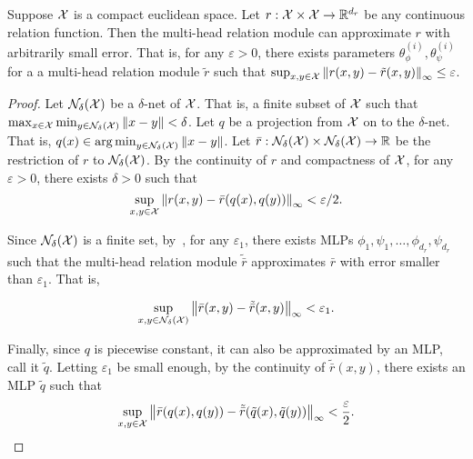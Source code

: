 \begin{theorem}\label{thm:mhr_approximates_cts_rels}
    Suppose ${\mathcal{X}}$ is a compact euclidean space. Let $r: {\mathcal{X}} \times {\mathcal{X}} \to \mathbb{R}^{d_r}$ be any continuous relation function. Then the multi-head relation module can approximate $r$ with arbitrarily small error. That is, for any $\varepsilon > 0$, there exists parameters $\theta_{\phi}^{(i)}, \theta_{\psi}^{(i)}$ for a a multi-head relation module $\tilde{r}$ such that $\sup_{x,y \in {\mathcal{X}}} \left\lVert r(x,y) - \tilde{r}(x,y)\right\rVert_{\infty} \leq \varepsilon$.
\end{theorem}

\begin{proof}
    \hphantom{~}

    Let ${\mathcal{N}}_\delta({\mathcal{X}})$ be a $\delta$-net of ${\mathcal{X}}$. That is, a finite subset of ${\mathcal{X}}$ such that $\max_{x \in {\mathcal{X}}} \min_{y \in {\mathcal{N}}_\delta({\mathcal{X}})} \left\lVert x - y\right\rVert < \delta$. Let $q$ be a projection from ${\mathcal{X}}$ on to the $\delta$-net. That is, $q(x) \in \operatorname*{arg\,min}_{y \in {\mathcal{N}}_\delta({\mathcal{X}})} \left\lVert x - y\right\rVert$. Let $\bar{r}: {\mathcal{N}}_\delta({\mathcal{X}}) \times {\mathcal{N}}_{\delta}({\mathcal{X}}) \to \mathbb{R}$ be the restriction of $r$ to ${\mathcal{N}}_{\delta}({\mathcal{X}})$. By the continuity of $r$ and compactness of ${\mathcal{X}}$, for any $\varepsilon > 0$, there exists $\delta > 0$ such that
    \begin{equation*}
        \sup_{x, y \in {\mathcal{X}}} \left\lVert r(x,y) - \bar{r}(q(x), q(y))\right\rVert_{\infty} < \varepsilon / 2.
    \end{equation*}

    Since ${\mathcal{N}}_\delta({\mathcal{X}})$ is a finite set, by~, for any $\varepsilon_1$, there exists MLPs $\phi_1, \psi_1, \ldots, \phi_{d_r}, \psi_{d_r}$ such that the multi-head relation module $\tilde{\bar{r}}$ approximates $\bar{r}$ with error smaller than $\varepsilon_1$. That is, 

    \begin{equation*}
        \sup_{x, y \in {\mathcal{N}}_\delta({\mathcal{X}})} \left\lVert\bar{r}(x,y) - \tilde{\bar{r}}(x,y)\right\rVert_{\infty} < \varepsilon_1.
    \end{equation*}

    Finally, since $q$ is piecewise constant, it can also be approximated by an MLP, call it $\tilde{q}$. Letting $\varepsilon_1$ be small enough, by the continuity of  $\tilde{\bar{r}}(x,y)$, there exists an MLP $\tilde{q}$ such that
    \begin{align*}
        \sup_{x, y \in {\mathcal{X}}} \left\lVert\bar{r}(q(x), q(y)) - \tilde{\bar{r}}(\tilde{q}(x), \tilde{q}(y))\right\rVert_{\infty} < \frac{\varepsilon}{2}.
    \end{align*}


\end{proof}
